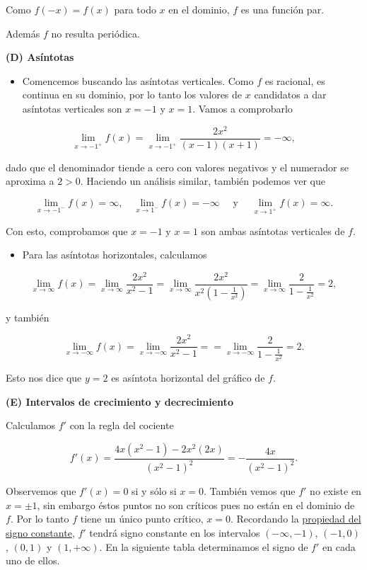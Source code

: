 \documentclass[
  letterpaper,
]{book}
\providecommand{\tightlist}{%
  \setlength{\itemsep}{0pt}\setlength{\parskip}{0pt}}
\theoremstyle{plain}
\theoremstyle{remark}
\begin{document}
\begin{tcolorbox}
Como \(f(-x)=f(x)\) para todo \(x\) en el dominio, \(f\) es una función
par.

Además \(f\) no resulta periódica.

\textbf{(D) Asíntotas}

\begin{itemize}
\tightlist
\item
  Comencemos buscando las asíntotas verticales. Como \(f\) es racional,
  es continua en su dominio, por lo tanto los valores de \(x\)
  candidatos a dar asíntotas verticales son \(x=-1\) y \(x=1\). Vamos a
  comprobarlo
\end{itemize}

\[
\lim_{x\to -1^+} f(x)=\lim_{x\to -1^+} \frac{2x^2}{(x-1)(x+1)}=-\infty,
\]

dado que el denominador tiende a cero con valores negativos y el
numerador se aproxima a \(2>0\). Haciendo un análisis similar, también
podemos ver que

\[
\lim_{x\to -1^-} f(x)=\infty, \quad \lim_{x\to 1^-} f(x)=-\infty \quad \text{ y } \quad \lim_{x\to 1^+} f(x)=\infty.
\]

Con esto, comprobamos que \(x=-1\) y \(x=1\) son ambas asíntotas
verticales de \(f\).

\begin{itemize}
\tightlist
\item
  Para las asíntotas horizontales, calculamos
\end{itemize}

\[
\lim_{x\to\infty} f(x)=\lim_{x\to \infty} \frac{2x^2}{x^2-1}=\lim_{x\to \infty} \frac{2x^2}{x^2\left(1-\frac{1}{x^2}\right)}=\lim_{x\to \infty} \frac{2}{1-\frac{1}{x^2}}=2,
\]

y también

\[
\lim_{x\to-\infty} f(x)=\lim_{x\to -\infty} \frac{2x^2}{x^2-1}==\lim_{x\to -\infty} \frac{2}{1-\frac{1}{x^2}}=2.
\]

Esto nos dice que \(y=2\) es asíntota horizontal del gráfico de \(f\).

\textbf{(E) Intervalos de crecimiento y decrecimiento}

Calculamos \(f'\) con la regla del cociente

\[
f'(x)=\frac{4x(x^2-1)-2x^2(2x)}{(x^2-1)^2}=-\frac{4x}{(x^2-1)^2}.
\]

Observemos que \(f'(x)=0\) si y sólo si \(x=0\). También vemos que
\(f'\) no existe en \(x=\pm 1\), sin embargo éstos puntos no son
críticos pues no están en el dominio de \(f\). Por lo tanto \(f\) tiene
un único punto crítico, \(x=0\). Recordando la
\hyperref[teo-propiedad-signoconst]{propiedad del signo constante},
\(f'\) tendrá signo constante en los intervalos \((-\infty, -1)\),
\((-1,0)\), \((0,1)\) y \((1,+\infty)\). En la siguiente tabla
determinamos el signo de \(f'\) en cada uno de ellos.


\end{tcolorbox}
\end{document}
